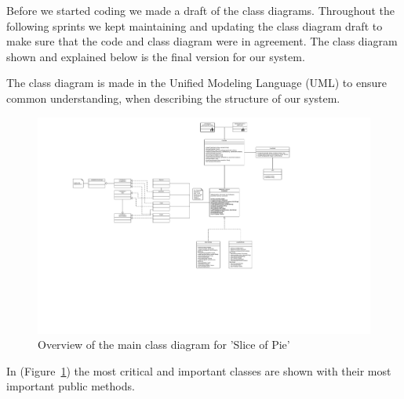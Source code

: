 Before we started coding we made a draft of the class diagrams. Throughout the following sprints we kept maintaining and updating the class diagram
draft to make sure that the code and class diagram were in agreement. The class diagram shown and explained below is the final version for our
system.

The class diagram is made in the Unified Modeling Language (UML) to ensure common understanding, when describing the structure of our system.

\begin{figure}[htb]
    \begin{center}
        \includegraphics[width=1\textwidth]{Software_design/graphics/mainClassDiagram.png}
        \caption{Overview of the main class diagram for 'Slice of Pie'}
        \label{fig:design-class_diagram}
    \end{center}
\end{figure}

In (Figure~\ref{fig:design-class_diagram}) the most critical and important classes are shown with their most important public methods. 
